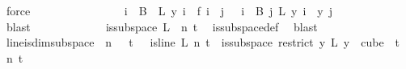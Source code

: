 \begin{isabellebody}
\ force\isanewline
\ \ \ \ \ \ \isamarkupfalse%
\isanewline
\isanewline
\ \ \ \ \ \ \isamarkupfalse%
\ \isamarkupfalse%
\ {\isachardoublequoteopen}{\isacharparenleft}{\kern0pt}{\isasymforall}i\ {\isasymin}\ B\ {}{\isachardot}{\kern0pt}\ {\isacharquery}{\kern0pt}L\ y\ i\ {\isacharequal}{\kern0pt}\ {\isacharquery}{\kern0pt}f\ i{\isacharparenright}{\kern0pt}\ {\isasymand}\ {\isacharparenleft}{\kern0pt}{\isasymforall}j\ {\isacharless}{\kern0pt}\ {}{\isachardot}{\kern0pt}\ {\isasymforall}i\ {\isasymin}\ B\ j{\isachardot}{\kern0pt}\ {\isacharparenleft}{\kern0pt}{\isacharquery}{\kern0pt}L\ y{\isacharparenright}{\kern0pt}\ i\ {\isacharequal}{\kern0pt}\ y\ j{\isacharparenright}{\kern0pt}{\isachardoublequoteclose}\ \isanewline
\ \ \ \ \ \ \ \ \isamarkupfalse%
\ blast\isanewline
\ \ \ \ \isamarkupfalse%
\isanewline
\ \ \isacommand{{\isacharbraceright}{\kern0pt}}\isamarkupfalse%
\isanewline
\ \ \isamarkupfalse%
\ \isamarkupfalse%
\ {\isachardoublequoteopen}is{\isacharunderscore}{\kern0pt}subspace\ {\isacharquery}{\kern0pt}L\ {}\ n\ t{\isachardoublequoteclose}\ \isamarkupfalse%
\ is{\isacharunderscore}{\kern0pt}subspace{\isacharunderscore}{\kern0pt}def\ \isamarkupfalse%
\ blast\isanewline
{}\isamarkupfalse%
%
\endisatagproof
{\isafoldproof}%
%
\isadelimproof
\isanewline
%
\endisadelimproof
\isanewline
{}\isamarkupfalse%
\ line{\isacharunderscore}{\kern0pt}is{\isacharunderscore}{\kern0pt}dim{}{\isacharunderscore}{\kern0pt}subspace{\isacharcolon}{\kern0pt}\ \ {\isachardoublequoteopen}n\ {\isachargreater}{\kern0pt}\ {}{\isachardoublequoteclose}\ {\isachardoublequoteopen}t\ {\isachargreater}{\kern0pt}\ {}{\isachardoublequoteclose}\ {\isachardoublequoteopen}is{\isacharunderscore}{\kern0pt}line\ L\ n\ t{\isachardoublequoteclose}\ \ {\isachardoublequoteopen}is{\isacharunderscore}{\kern0pt}subspace\ {\isacharparenleft}{\kern0pt}restrict\ {\isacharparenleft}{\kern0pt}{\isasymlambda}y{\isachardot}{\kern0pt}\ L\ {\isacharparenleft}{\kern0pt}y\ {}{\isacharparenright}{\kern0pt}{\isacharparenright}{\kern0pt}\ {\isacharparenleft}{\kern0pt}cube\ {}\ t{\isacharparenright}{\kern0pt}{\isacharparenright}{\kern0pt}\ {}\ n\ t{\isachardoublequoteclose}\isanewline
%
\isadelimproof
\ \ %
\endisadelimproof
%
\isatagproof
{}\isamarkupfalse%

\end{isabellebody}
